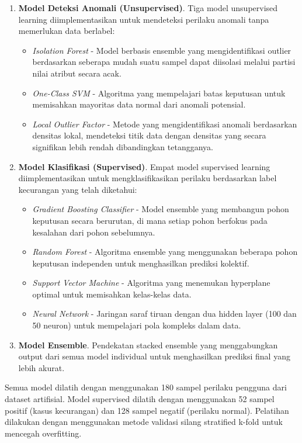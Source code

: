 \begin{enumerate}
    \item \textbf{Model Deteksi Anomali (Unsupervised)}. Tiga model unsupervised learning diimplementasikan untuk mendeteksi perilaku anomali tanpa memerlukan data berlabel:
    \begin{itemize}
        \item \textit{Isolation Forest} - Model berbasis ensemble yang mengidentifikasi outlier berdasarkan seberapa mudah suatu sampel dapat diisolasi melalui partisi nilai atribut secara acak.
        \item \textit{One-Class SVM} - Algoritma yang mempelajari batas keputusan untuk memisahkan mayoritas data normal dari anomali potensial.
        \item \textit{Local Outlier Factor} - Metode yang mengidentifikasi anomali berdasarkan densitas lokal, mendeteksi titik data dengan densitas yang secara signifikan lebih rendah dibandingkan tetangganya.
    \end{itemize}
    
    \item \textbf{Model Klasifikasi (Supervised)}. Empat model supervised learning diimplementasikan untuk mengklasifikasikan perilaku berdasarkan label kecurangan yang telah diketahui:
    \begin{itemize}
        \item \textit{Gradient Boosting Classifier} - Model ensemble yang membangun pohon keputusan secara berurutan, di mana setiap pohon berfokus pada kesalahan dari pohon sebelumnya.
        \item \textit{Random Forest} - Algoritma ensemble yang menggunakan beberapa pohon keputusan independen untuk menghasilkan prediksi kolektif.
        \item \textit{Support Vector Machine} - Algoritma yang menemukan hyperplane optimal untuk memisahkan kelas-kelas data.
        \item \textit{Neural Network} - Jaringan saraf tiruan dengan dua hidden layer (100 dan 50 neuron) untuk mempelajari pola kompleks dalam data.
    \end{itemize}
    
    \item \textbf{Model Ensemble}. Pendekatan stacked ensemble yang menggabungkan output dari semua model individual untuk menghasilkan prediksi final yang lebih akurat.
\end{enumerate}

Semua model dilatih dengan menggunakan 180 sampel perilaku pengguna dari dataset artifisial. Model supervised dilatih dengan menggunakan 52 sampel positif (kasus kecurangan) dan 128 sampel negatif (perilaku normal). Pelatihan dilakukan dengan menggunakan metode validasi silang stratified k-fold untuk mencegah overfitting.

